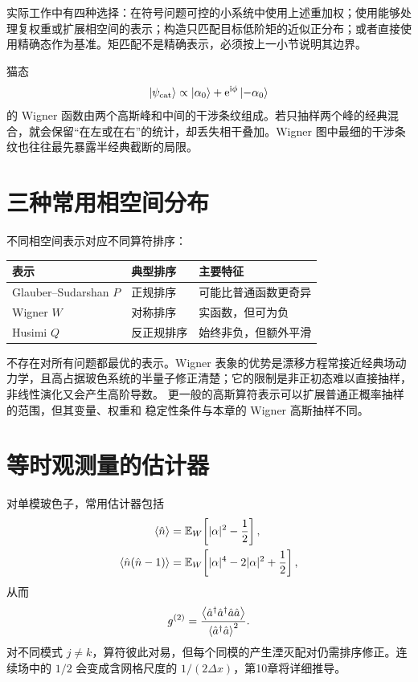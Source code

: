 实际工作中有四种选择：在符号问题可控的小系统中使用上述重加权；使用能够处理复权重或扩展相空间的表示；构造只匹配目标低阶矩的近似正分布；或者直接使用精确态作为基准。矩匹配不是精确表示，必须按上一小节说明其边界。

猫态
\begin{equation}
  \left\lvert \psi_{\mathrm{cat}}\right\rangle\propto
  \left\lvert \alpha_0\right\rangle+\mathrm{e}^{\mathrm{i}\phi}\left\lvert -\alpha_0\right\rangle
\end{equation}
的 Wigner 函数由两个高斯峰和中间的干涉条纹组成。若只抽样两个峰的经典混合，就会保留“在左或在右”的统计，却丢失相干叠加。Wigner 图中最细的干涉条纹也往往最先暴露半经典截断的局限。

\section{三种常用相空间分布}

不同相空间表示对应不同算符排序：
\begin{center}
\begin{tabular}{lll}
\toprule
表示 & 典型排序 & 主要特征 \\
\midrule
Glauber--Sudarshan $P$ & 正规排序 & 可能比普通函数更奇异 \\
Wigner $W$ & 对称排序 & 实函数，但可为负 \\
Husimi $Q$ & 反正规排序 & 始终非负，但额外平滑 \\
\bottomrule
\end{tabular}
\end{center}
不存在对所有问题都最优的表示。Wigner 表象的优势是漂移方程常接近经典场动力学，且高占据玻色系统的半量子修正清楚；它的限制是非正初态难以直接抽样，非线性演化又会产生高阶导数。
更一般的高斯算符表示可以扩展普通正概率抽样的范围，但其变量、权重和
稳定性条件与本章的 Wigner 高斯抽样不同\cite{Corney2003}。

\section{等时观测量的估计器}

对单模玻色子，常用估计器包括
\begin{align}
  \left\langle \hat n\right\rangle
  &=\mathbb{E}_{W}\!\left[|\alpha|^2-\frac12\right],\\
  \left\langle \hat n(\hat n-1)\right\rangle
  &=\mathbb{E}_{W}\!\left[|\alpha|^4-2|\alpha|^2+\frac12\right],
  \label{eq:wigner-factorial-moments}
\end{align}
从而
\begin{equation}
  g^{(2)}=
  \frac{\left\langle \hat a^{\dagger}\hat a^{\dagger}\hat a\hat a\right\rangle}
  {\left\langle \hat a^{\dagger}\hat a\right\rangle^2}.
\end{equation}
对不同模式 $j\neq k$，算符彼此对易，但每个同模的产生湮灭配对仍需排序修正。连续场中的 $1/2$ 会变成含网格尺度的 $1/(2\Delta x)$，第10章将详细推导。

